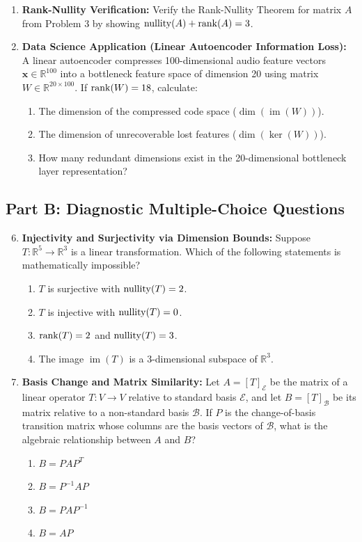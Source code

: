 \begin{enumerate}
\item \textbf{Rank-Nullity Verification:} Verify the Rank-Nullity Theorem for matrix $A$ from Problem 3 by showing $\operatorname{nullity}(A) + \operatorname{rank}(A) = 3$.

\item \textbf{Data Science Application (Linear Autoencoder Information Loss):} A linear autoencoder compresses 100-dimensional audio feature vectors $\mathbf{x} \in \mathbb{R}^{100}$ into a bottleneck feature space of dimension 20 using matrix $W \in \mathbb{R}^{20 \times 100}$. If $\operatorname{rank}(W) = 18$, calculate:
\begin{enumerate}
    \item The dimension of the compressed code space ($\dim(\operatorname{im}(W))$).
    \item The dimension of unrecoverable lost features ($\dim(\ker(W))$).
    \item How many redundant dimensions exist in the 20-dimensional bottleneck layer representation?
\end{enumerate}
\end{enumerate}

\subsection*{Part B: Diagnostic Multiple-Choice Questions}
\begin{enumerate}
\setcounter{enumi}{5}
\item \textbf{Injectivity and Surjectivity via Dimension Bounds:} Suppose $T: \mathbb{R}^5 \to \mathbb{R}^3$ is a linear transformation. Which of the following statements is mathematically impossible?
\begin{enumerate}
    \item $T$ is surjective with $\operatorname{nullity}(T) = 2$.
    \item $T$ is injective with $\operatorname{nullity}(T) = 0$.
    \item $\operatorname{rank}(T) = 2$ and $\operatorname{nullity}(T) = 3$.
    \item The image $\operatorname{im}(T)$ is a 3-dimensional subspace of $\mathbb{R}^3$.
\end{enumerate}

\item \textbf{Basis Change and Matrix Similarity:} Let $A = [T]_\mathcal{E}$ be the matrix of a linear operator $T: V \to V$ relative to standard basis $\mathcal{E}$, and let $B = [T]_\mathcal{B}$ be its matrix relative to a non-standard basis $\mathcal{B}$. If $P$ is the change-of-basis transition matrix whose columns are the basis vectors of $\mathcal{B}$, what is the algebraic relationship between $A$ and $B$?
\begin{enumerate}
    \item $B = P A P^T$
    \item $B = P^{-1} A P$
    \item $B = P A P^{-1}$
    \item $B = A P$
\end{enumerate}
\end{enumerate}
